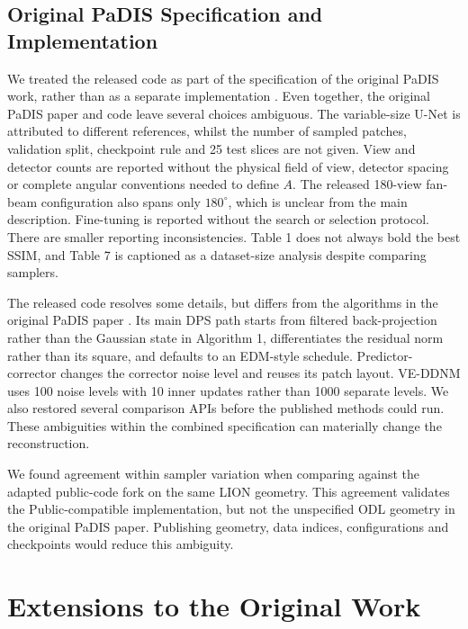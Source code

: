 \subsection{Original PaDIS Specification and Implementation}
\label{sec:discussion-reproducibility}

We treated the released code as part of the specification of the original PaDIS work, rather than as a separate implementation \cite{hu_learning_2024,hu_jasonhu4padis_2026-1}. Even together, the original PaDIS paper and code leave several choices ambiguous. The variable-size U-Net is attributed to different references, whilst the number of sampled patches, validation split, checkpoint rule and 25 test slices are not given. View and detector counts are reported without the physical field of view, detector spacing or complete angular conventions needed to define \(A\). The released 180-view fan-beam configuration also spans only \(180^\circ\), which is unclear from the main description. Fine-tuning is reported without the search or selection protocol. There are smaller reporting inconsistencies. Table 1 does not always bold the best SSIM, and Table 7 is captioned as a dataset-size analysis despite comparing samplers.

The released code resolves some details, but differs from the algorithms in the original PaDIS paper \cite{hu_learning_2024,hu_jasonhu4padis_2026-1}. Its main DPS path starts from filtered back-projection rather than the Gaussian state in Algorithm 1, differentiates the residual norm rather than its square, and defaults to an EDM-style schedule. Predictor-corrector changes the corrector noise level and reuses its patch layout. VE-DDNM uses 100 noise levels with 10 inner updates rather than 1000 separate levels. We also restored several comparison APIs before the published methods could run. These ambiguities within the combined specification can materially change the reconstruction.

We found agreement within sampler variation when comparing against the adapted public-code fork on the same LION geometry. This agreement validates the Public-compatible implementation, but not the unspecified ODL geometry in the original PaDIS paper. Publishing geometry, data indices, configurations and checkpoints would reduce this ambiguity.

\section{Extensions to the Original Work}

